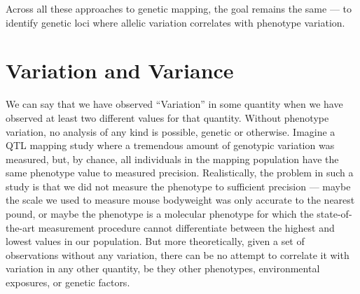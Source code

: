\begin{enumerate}

\end{enumerate}

Across all these approaches to genetic mapping, the goal remains the same --- to identify genetic loci where allelic variation correlates with phenotype variation.

\section{Variation and Variance}

We can say that we have observed ``Variation'' in some quantity when we have observed at least two different values for that quantity.
Without phenotype variation, no analysis of any kind is possible, genetic or otherwise.
Imagine a QTL mapping study where a tremendous amount of genotypic variation was measured, but, by chance, all individuals in the mapping population have the same phenotype value to measured precision.
Realistically, the problem in such a study is that we did not measure the phenotype to sufficient precision --- maybe the scale we used to measure mouse bodyweight was only accurate to the nearest pound, or maybe the phenotype is a molecular phenotype for which the state-of-the-art measurement procedure cannot differentiate between the highest and lowest values in our population.
But more theoretically, given a set of observations without any variation, there can be no attempt to correlate it with variation in any other quantity, be they other phenotypes, environmental exposures, or genetic factors.

